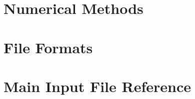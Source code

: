 \documentclass[12pt,a4paper]{report}
\begin{document}








\chapter{Numerical Methods}






%


\chapter{File Formats}
\label{chapter:file-formats}





% 
%   

%  
% 
%  

\chapter{Main Input File Reference}
\label{chapter:input-tree-reference}






\end{document}
